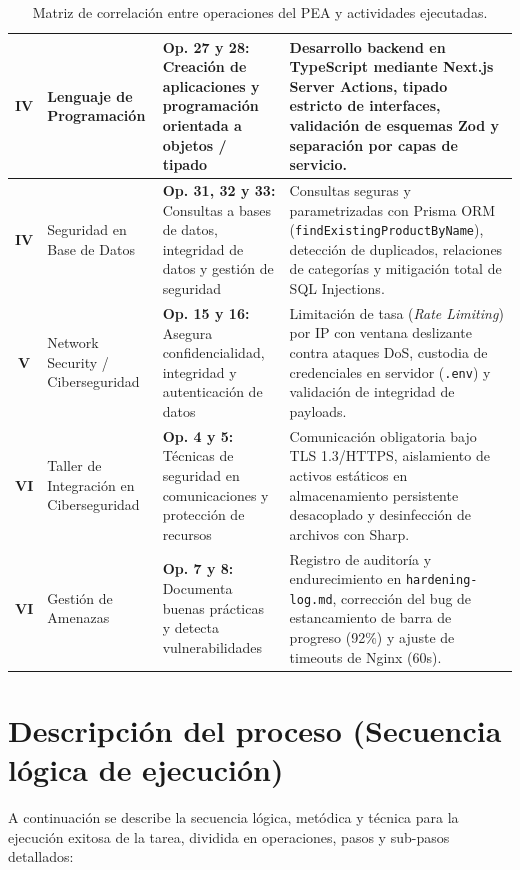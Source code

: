 \documentclass[11pt,a4paper]{article}
\begin{document}
\begin{table}[htbp]
\begin{tabularx}{\textwidth}{c p{3.8cm} p{4.2cm} X}
\midrule
\rowcolor{lightrow}
\textbf{IV} & Lenguaje de Programación & \textbf{Op. 27 y 28:} Creación de aplicaciones y programación orientada a objetos / tipado & Desarrollo backend en TypeScript mediante Next.js Server Actions, tipado estricto de interfaces, validación de esquemas Zod y separación por capas de servicio. \\
\midrule
\textbf{IV} & Seguridad en Base de Datos & \textbf{Op. 31, 32 y 33:} Consultas a bases de datos, integridad de datos y gestión de seguridad & Consultas seguras y parametrizadas con Prisma ORM (\texttt{findExistingProductByName}), detección de duplicados, relaciones de categorías y mitigación total de SQL Injections. \\
\midrule
\rowcolor{lightrow}
\textbf{V} & Network Security / Ciberseguridad & \textbf{Op. 15 y 16:} Asegura confidencialidad, integridad y autenticación de datos & Limitación de tasa (\textit{Rate Limiting}) por IP con ventana deslizante contra ataques DoS, custodia de credenciales en servidor (\texttt{.env}) y validación de integridad de payloads. \\
\midrule
\textbf{VI} & Taller de Integración en Ciberseguridad & \textbf{Op. 4 y 5:} Técnicas de seguridad en comunicaciones y protección de recursos & Comunicación obligatoria bajo TLS 1.3/HTTPS, aislamiento de activos estáticos en almacenamiento persistente desacoplado y desinfección de archivos con Sharp. \\
\midrule
\rowcolor{lightrow}
\textbf{VI} & Gestión de Amenazas & \textbf{Op. 7 y 8:} Documenta buenas prácticas y detecta vulnerabilidades & Registro de auditoría y endurecimiento en \texttt{hardening-log.md}, corrección del bug de estancamiento de barra de progreso (92\%) y ajuste de timeouts de Nginx (60s). \\
\bottomrule
\end{tabularx}
\caption{Matriz de correlación entre operaciones del PEA y actividades ejecutadas.}
\end{table}

\newpage

\section{Descripción del proceso (Secuencia lógica de ejecución)}

A continuación se describe la secuencia lógica, metódica y técnica para la ejecución exitosa de la tarea, dividida en operaciones, pasos y sub-pasos detallados:
\end{document}
